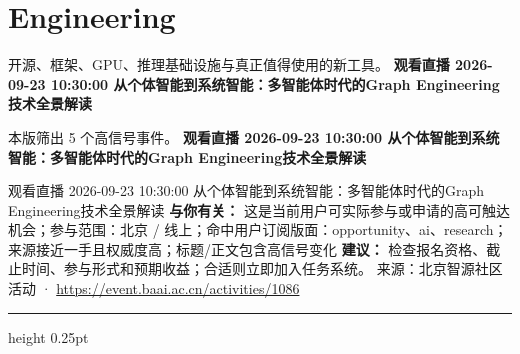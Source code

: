 \documentclass[10.5pt]{ctexart}
\begin{document}
\section*{Engineering}
{\color{ormuted} 开源、框架、GPU、推理基础设施与真正值得使用的新工具。}
\vspace{2mm}
{\LARGE\bfseries 观看直播 2026-09-23 10:30:00 从个体智能到系统智能：多智能体时代的Graph Engineering技术全景解读}\par
\vspace{1mm}
{\color{ormuted} 本版筛出 5 个高信号事件。}
\vspace{3mm}
{\Large\bfseries 观看直播 2026-09-23 10:30:00 从个体智能到系统智能：多智能体时代的Graph Engineering技术全景解读}\par
观看直播 2026-09-23 10:30:00 从个体智能到系统智能：多智能体时代的Graph Engineering技术全景解读
\textbf{与你有关：} 这是当前用户可实际参与或申请的高可触达机会；参与范围：北京 / 线上；命中用户订阅版面：opportunity、ai、research；来源接近一手且权威度高；标题/正文包含高信号变化
\textbf{建议：} 检查报名资格、截止时间、参与形式和预期收益；合适则立即加入任务系统。
{\footnotesize\color{ormuted} 来源：北京智源社区活动 · \url{https://event.baai.ac.cn/activities/1086}}
\vspace{4mm}
\hrule height 0.25pt
\vspace{3mm}
\end{document}
